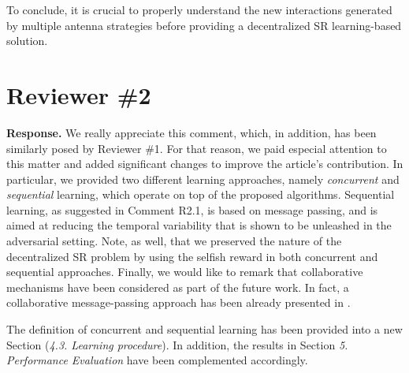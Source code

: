\documentclass[a4paper,twoside,11pt]{reviewresponse}
\begin{document}
To conclude, it is crucial to properly understand the new interactions generated by multiple antenna strategies before providing a decentralized SR learning-based solution.
	
\section{Reviewer \#2}



\textbf{Response.} We really appreciate this comment, which, in addition, has been similarly posed by Reviewer \#1. For that reason, we paid especial attention to this matter and added significant changes to improve the article's contribution. In particular, we provided two different learning approaches, namely \textit{concurrent} and \textit{sequential} learning, which operate on top of the proposed algorithms. Sequential learning, as suggested in Comment R2.1, is based on message passing, and is aimed at reducing the temporal variability that is shown to be unleashed in the adversarial setting. Note, as well, that we preserved the nature of the decentralized SR problem by using the selfish reward in both concurrent and sequential approaches. Finally, we would like to remark that collaborative mechanisms have been considered as part of the future work. In fact, a collaborative message-passing approach has been already presented in \cite{wilhelmi2018potential}. 

The definition of concurrent and sequential learning has been provided into a new Section (\textit{4.3. Learning procedure}). In addition, the results in Section \textit{5. Performance Evaluation} have been complemented accordingly.
\end{document}

